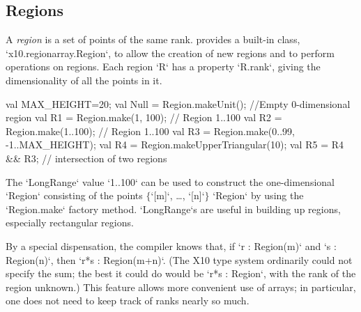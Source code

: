 \subsection{Regions}\label{XtenRegions}

A {\em region} is a set of points of the same rank.  {}\Xten{}
provides a built-in class, \xcd`x10.regionarray.Region`, to allow the
creation of new regions and to perform operations on regions. 
Each region \xcd`R` has a property \xcd`R.rank`, giving the dimensionality of
all the points in it.

\begin{ex}
\begin{xten}
val MAX_HEIGHT=20;
val Null = Region.makeUnit(); //Empty 0-dimensional region
val R1 = Region.make(1, 100); // Region 1..100
val R2 = Region.make(1..100);  // Region 1..100
val R3 = Region.make(0..99, -1..MAX_HEIGHT);
val R4 = Region.makeUpperTriangular(10);
val R5 = R4 && R3; // intersection of two regions
\end{xten}

The \xcd`LongRange` value \xcd`1..100` can be used to construct
the one-dimensional \xcd`Region` consisting of the points
$\{$\xcdmath`[m]`, \dots, \xcdmath`[n]`$\}$
\xcd`Region` by using the \xcd`Region.make` factory method.  
\xcd`LongRange`s are useful in building up regions, especially rectangular regions.  
\end{ex}

By a special dispensation, the compiler knows that, if \xcd`r : Region(m)` and
\xcd`s : Region(n)`, then \xcd`r*s : Region(m+n)`.  (The X10 type system
ordinarily could not specify the sum; the best it could do 
would be \xcd`r*s : Region`, with the rank of the region unknown.)  This
feature allows more convenient use of arrays; in particular, one does not need
to keep track of ranks nearly so much.

